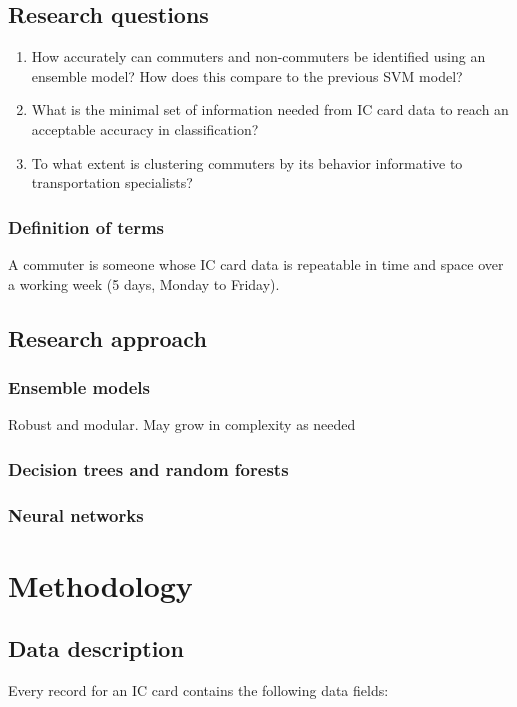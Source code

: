 \documentclass{article}
\begin{document}
\subsection{Research questions}
\begin{enumerate}
\item How accurately can commuters and non-commuters be identified using an ensemble model? How does this compare to the previous SVM model?
\item What is the minimal set of information needed from IC card data to reach an acceptable accuracy in classification?
\item To what extent is clustering commuters by its behavior informative to transportation specialists? 
\end{enumerate}

\subsubsection{Definition of terms}
A commuter is someone whose IC card data is repeatable in time and space over a working week (5 days, Monday to Friday).

\subsection{Research approach}

\subsubsection{Ensemble models}
Robust and modular. May grow in complexity as needed

\subsubsection{Decision trees and random forests}

\subsubsection{Neural networks}


\section{Methodology}
\subsection{Data description}
Every record for an IC card contains the following data fields:
\end{document}
